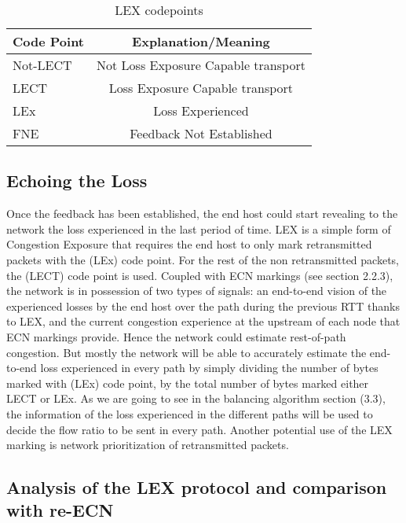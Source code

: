 \begin{table}
\begin{center}
\begin{tabular}{| l | c| } \hline
Code Point & Explanation/Meaning \\ \hline
Not-LECT & Not Loss Exposure Capable transport \\
LECT & Loss Exposure Capable transport \\
LEx & Loss Experienced \\
FNE & Feedback Not Established \\
\hline
\end{tabular}
\caption{
  LEX codepoints
}
\end{center}
\end{table}

\subsection{Echoing the Loss}

Once the feedback has been established, the end host could start revealing to the network the loss experienced in the last period of time. LEX is a simple form of Congestion Exposure that requires the end host to only mark retransmitted packets with the (LEx) code point. For the rest of the non retransmitted packets, the (LECT) code point is used. Coupled with ECN markings (see section 2.2.3), the network is in possession of two types of signals: an end-to-end vision of the experienced losses by the end host over the path during the previous RTT thanks to LEX, and the  current congestion experience at the upstream of each node that ECN markings provide. Hence the network could estimate rest-of-path congestion. But mostly the network will be able to accurately estimate the end-to-end loss experienced in every path by simply dividing the number of bytes marked with (LEx) code point,  by the total number of bytes marked either LECT or LEx. As we are going to see in the balancing algorithm section (3.3), the information of the loss experienced in the different paths will be used to decide the flow ratio to be sent in every path. Another potential use of the LEX marking is network prioritization of retransmitted packets.

\subsection{Analysis of the LEX protocol and comparison with re-ECN}

